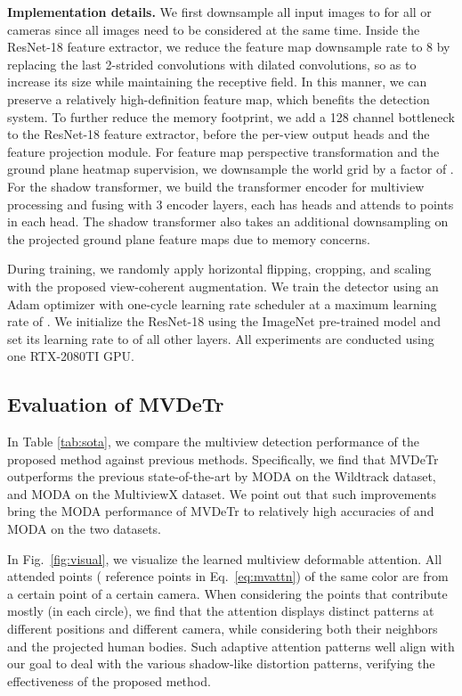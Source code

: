 \documentclass[sigconf,authorversion,nonacm]{acmart}
\begin{document}
\textbf{Implementation details.}
We first downsample all input images to  for all  or  cameras since all images need to be considered at the same time. 
Inside the ResNet-18 feature extractor, we reduce the feature map downsample rate to 8 by replacing the last 2-strided convolutions with dilated convolutions, so as to increase its size while maintaining the receptive field. In this manner, we can preserve a relatively high-definition feature map, which benefits the detection system. To further reduce the memory footprint, we add a 128 channel bottleneck to the ResNet-18 feature extractor, before the per-view output heads and the feature projection module. 
For feature map perspective transformation and the ground plane heatmap supervision, we downsample the world grid by a factor of . 
For the shadow transformer, we build the transformer encoder for multiview processing and fusing with 3 encoder layers, each has  heads and attends to  points in each head. The shadow transformer also takes an additional  downsampling on the projected ground plane feature maps due to memory concerns. 

During training, we randomly apply horizontal flipping, cropping, and scaling with the proposed view-coherent augmentation. We train the detector using an Adam optimizer \cite{kingma2015adam} with one-cycle learning rate scheduler \cite{smith2019super} at a maximum learning rate of . We initialize the ResNet-18 using the ImageNet \cite{imagenet_cvpr09} pre-trained model and set its learning rate to  of all other layers. 
All experiments are conducted using one RTX-2080TI GPU. 



\subsection{Evaluation of MVDeTr}
In Table \ref{tab:sota}, we compare the multiview detection performance of the proposed method against previous methods. Specifically, we find that MVDeTr outperforms the previous state-of-the-art by  MODA on the Wildtrack dataset, and  MODA on the MultiviewX dataset. We point out that such improvements bring the MODA performance of MVDeTr to relatively high accuracies of   and  MODA on the two datasets. 


In Fig.~\ref{fig:visual}, we visualize the learned multiview deformable attention. All attended points ( reference points in Eq.~\ref{eq:mvattn}) of the same color are from a certain point of a certain camera. When considering the points that contribute mostly (in each circle), we find that the attention displays distinct patterns at different positions and different camera, while considering both their neighbors and the projected human bodies. Such adaptive attention patterns well align with our goal to deal with the various shadow-like distortion patterns, verifying the effectiveness of the proposed method. 
\end{document}

